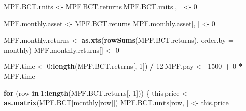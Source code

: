 \documentclass[]{article}
\newenvironment{Shaded}{\begin{snugshade}}{\end{snugshade}}
\newcommand{\ControlFlowTok}[1]{\textcolor[rgb]{0.13,0.29,0.53}{\textbf{#1}}}
\newcommand{\DataTypeTok}[1]{\textcolor[rgb]{0.13,0.29,0.53}{#1}}
\newcommand{\DecValTok}[1]{\textcolor[rgb]{0.00,0.00,0.81}{#1}}
\newcommand{\KeywordTok}[1]{\textcolor[rgb]{0.13,0.29,0.53}{\textbf{#1}}}
\newcommand{\NormalTok}[1]{#1}
\newcommand{\OperatorTok}[1]{\textcolor[rgb]{0.81,0.36,0.00}{\textbf{#1}}}
\newcommand{\StringTok}[1]{\textcolor[rgb]{0.31,0.60,0.02}{#1}}
\begin{document}
\begin{Shaded}
\begin{Highlighting}[]
\NormalTok{MPF.BCT.units <-}\StringTok{ }\NormalTok{MPF.BCT.returns}
\NormalTok{MPF.BCT.units[, ] <-}\StringTok{ }\DecValTok{0}

\NormalTok{MPF.monthly.asset <-}\StringTok{ }\NormalTok{MPF.BCT.returns}
\NormalTok{MPF.monthly.asset[, ] <-}\StringTok{ }\DecValTok{0}

\NormalTok{MPF.monthly.returns <-}
\StringTok{  }\KeywordTok{as.xts}\NormalTok{(}\KeywordTok{rowSums}\NormalTok{(MPF.BCT.returns), }\DataTypeTok{order.by =}\NormalTok{ monthly)}
\NormalTok{MPF.monthly.returns[] <-}\StringTok{ }\DecValTok{0}

\NormalTok{MPF.time <-}\StringTok{ }\DecValTok{0}\OperatorTok{:}\KeywordTok{length}\NormalTok{(MPF.BCT.returns[, }\DecValTok{1}\NormalTok{]) }\OperatorTok{/}\StringTok{ }\DecValTok{12}
\NormalTok{MPF.pay <-}\StringTok{ }\DecValTok{-1500} \OperatorTok{+}\StringTok{ }\DecValTok{0} \OperatorTok{*}\StringTok{ }\NormalTok{MPF.time}

\ControlFlowTok{for}\NormalTok{ (row }\ControlFlowTok{in} \DecValTok{1}\OperatorTok{:}\KeywordTok{length}\NormalTok{(MPF.BCT.returns[, }\DecValTok{1}\NormalTok{])) \{}
\NormalTok{  this.price <-}\StringTok{ }\KeywordTok{as.matrix}\NormalTok{(MPF.BCT[monthly[row]])}
\NormalTok{  MPF.BCT.units[row, ] <-}\StringTok{ }\NormalTok{this.price}
  

\end{Highlighting}
\end{Shaded}
\end{document}
